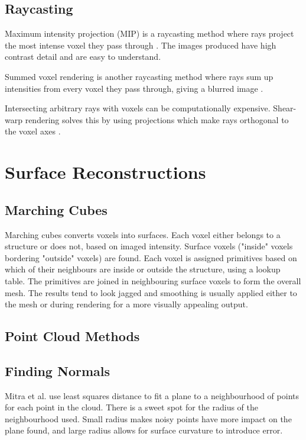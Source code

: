 \documentclass[acmsmall, 12pt]{acmart}
\begin{document}
\subsection{Raycasting}

Maximum intensity projection (MIP) is a raycasting method where rays project the most intense voxel they pass through \cite{birkfellner2016applied}. The images produced have high contrast detail and are easy to understand.

Summed voxel rendering is another raycasting method where rays sum up intensities from every voxel they pass through, giving a blurred image \cite{birkfellner2016applied}.

Intersecting arbitrary rays with voxels can be computationally expensive. Shear-warp rendering solves this by using projections which make rays orthogonal to the voxel axes \cite{lacroute1994fast}. 


\section{Surface Reconstructions}

\subsection{Marching Cubes}

Marching cubes \cite{lorensen1987marching} converts voxels into surfaces. Each voxel either belongs to a structure or does not, based on imaged intensity. Surface voxels ("inside" voxels bordering "outside" voxels) are found. Each voxel is assigned primitives based on which of their neighbours are inside or outside the structure, using a lookup table. The primitives are joined in neighbouring surface voxels to form the overall mesh. The results tend to look jagged and smoothing is usually applied either to the mesh or during rendering for a more visually appealing output.

\subsection{Point Cloud Methods}

\subsection{Finding Normals}

Mitra et al. \cite{mitra2003estimating} use least squares distance to fit a plane to a neighbourhood of points for each point in the cloud. There is a sweet spot for the radius of the neighbourhood used. Small radius makes noisy points have more impact on the plane found, and large radius allows for surface curvature to introduce error. 
\end{document}

